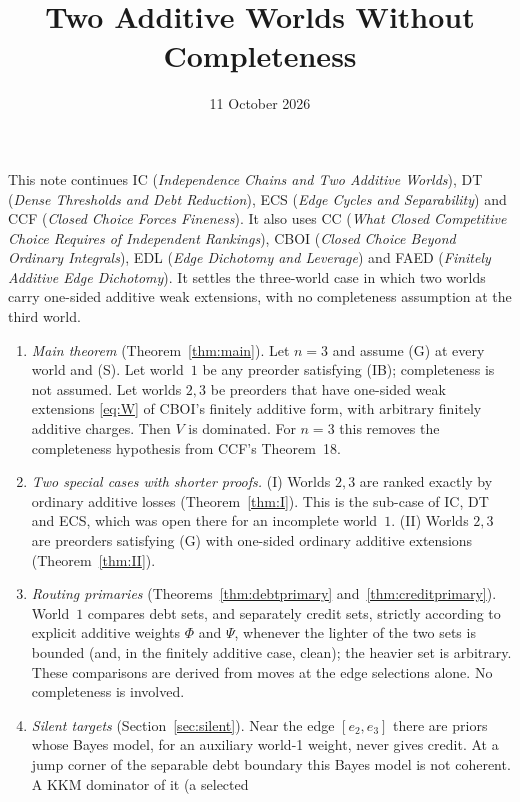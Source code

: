 \documentclass[11pt]{article}
\title{Two Additive Worlds Without Completeness}
\author{}\date{11 October 2026}
\theoremstyle{definition}\newtheorem{definition}[theorem]{Definition}
\theoremstyle{remark}\newtheorem{remark}[theorem]{Remark}
\begin{document}
\maketitle

\noindent
This note continues IC (\emph{Independence Chains and Two Additive Worlds}),
DT (\emph{Dense Thresholds and Debt Reduction}), ECS (\emph{Edge Cycles and
Separability}) and CCF (\emph{Closed Choice Forces Fineness}).
It also uses CC (\emph{What Closed Competitive Choice Requires of
Independent Rankings}), CBOI (\emph{Closed Choice Beyond Ordinary Integrals}),
EDL (\emph{Edge Dichotomy and Leverage}) and FAED (\emph{Finitely Additive Edge
Dichotomy}). It settles the
three-world case in which two worlds carry one-sided additive weak
extensions, with no completeness assumption at the third world.

\begin{enumerate}[leftmargin=*,itemsep=3pt]
\item \emph{Main theorem} (Theorem~\ref{thm:main}). Let $n=3$ and assume (G)
at every world and (S). Let world~$1$ be any preorder satisfying (IB);
completeness is not assumed. Let worlds $2,3$ be preorders that have
one-sided weak extensions \eqref{eq:W} of CBOI's finitely additive form, with
arbitrary finitely additive charges. Then $V$ is dominated. For $n=3$ this
removes the completeness hypothesis from CCF's Theorem~18.
\item \emph{Two special cases with shorter proofs.} (I) Worlds $2,3$ are
ranked exactly by ordinary additive losses (Theorem~\ref{thm:I}). This is the
sub-case of IC, DT and ECS, which was open there for an incomplete world~$1$.
(II) Worlds $2,3$ are preorders satisfying (G) with one-sided ordinary
additive extensions (Theorem~\ref{thm:II}).
\item \emph{Routing primaries} (Theorems~\ref{thm:debtprimary}
and~\ref{thm:creditprimary}). World~$1$ compares debt sets, and separately
credit sets, strictly according to explicit additive weights $\Phi$ and
$\Psi$, whenever the lighter of the two sets is bounded (and, in the
finitely additive case, clean); the heavier set is arbitrary. These
comparisons are derived from moves at the edge selections alone. No
completeness is involved.
\item \emph{Silent targets} (Section~\ref{sec:silent}). Near the edge
$[e_2,e_3]$ there are priors whose Bayes model, for an auxiliary world-1
weight, never gives credit. At a jump corner of the separable debt boundary
this Bayes model is not coherent. A KKM dominator of it (a selected

\end{enumerate}
\end{document}
